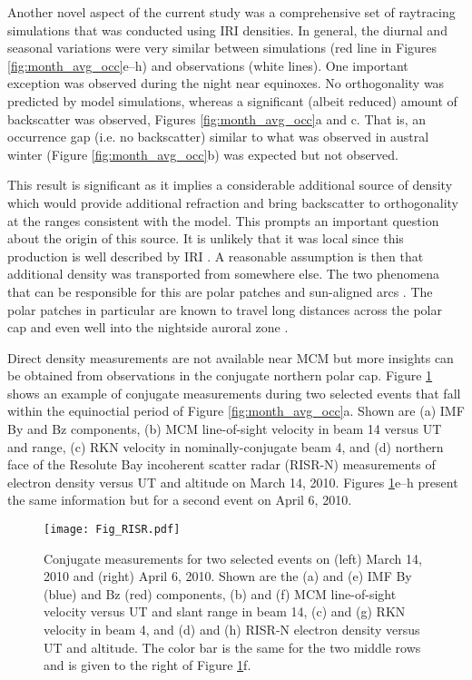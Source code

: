 Another novel aspect of the current study was a comprehensive set of raytracing simulations that was conducted using IRI densities. In general, the diurnal and seasonal variations were very similar between simulations (red line in Figures \ref{fig:month_avg_occ}e--h) and observations (white lines). One important exception was observed during the night near equinoxes. No orthogonality was predicted by model simulations, whereas a significant (albeit reduced) amount of backscatter was observed, Figures \ref{fig:month_avg_occ}a and c. That is, an occurrence gap (i.e. no backscatter) similar to what was observed in austral winter (Figure \ref{fig:month_avg_occ}b) was expected but not observed.



This result is significant as it implies a considerable additional source of density which would provide additional refraction and bring backscatter to orthogonality at the ranges consistent with the model. This prompts an important question about the origin of this source. It is unlikely that it was local since this production is well described by IRI \citep[e.g.][]{Themens2014}. A reasonable assumption is then that additional density was transported from somewhere else. The two phenomena that can be responsible for this are polar patches \citep{Weber1984} and sun-aligned arcs \citep{Valladares1994}. The polar patches in particular are known to travel long distances across the polar cap and even well into the nightside auroral zone \citep{Moen2007,Oksavick2010}.

Direct density measurements are not available near MCM but more insights can be obtained from observations in the conjugate northern polar cap. Figure \ref{fig:patchy_example} shows an example of conjugate measurements during two selected events that fall within the equinoctial period of Figure \ref{fig:month_avg_occ}a. Shown are (a) IMF By and Bz components, (b) MCM line-of-sight velocity in beam 14 versus UT and range, (c) RKN velocity in nominally-conjugate beam 4, and (d) northern face of the Resolute Bay incoherent scatter radar (RISR-N) measurements of electron density versus UT and altitude on March 14, 2010. Figures \ref{fig:patchy_example}e--h present the same information but for a second event on April 6, 2010.

\begin{figure}
\texttt{[image: Fig\_RISR.pdf]}
\caption{Conjugate measurements for two selected events on (left) March 14, 2010 and (right) April 6, 2010. Shown are the (a) and (e) IMF By (blue) and Bz (red) components, (b) and (f) MCM line-of-sight velocity versus UT and slant range in beam 14, (c) and (g) RKN velocity in beam 4, and (d) and (h) RISR-N electron density versus UT and altitude. The color bar is the same for the two middle rows and is given to the right of Figure \ref{fig:patchy_example}f.}
\label{fig:patchy_example}
\end{figure}

